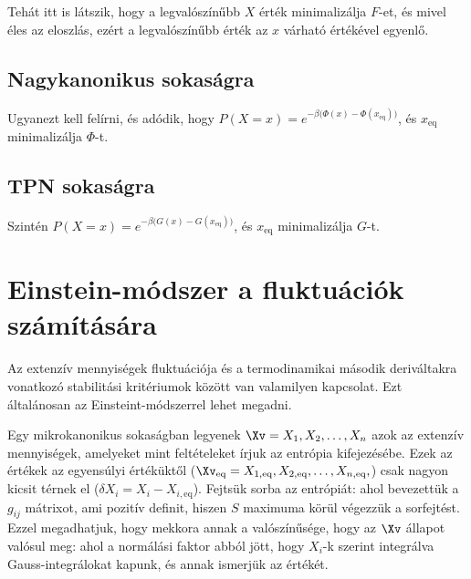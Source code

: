    Tehát itt is látszik, hogy a legvalószínűbb $X$ érték minimalizálja $F$-et, és mivel éles az eloszlás, ezért a legvalószínűbb érték az $x$ várható értékével egyenlő.
   
  \subsection{Nagykanonikus sokaságra}
   
   Ugyanezt kell felírni, és adódik, hogy $P(X=x)=e^{-\beta\big(\Phi(x)-\Phi(x_\text{eq})\big)}$, és $x_\text{eq}$ minimalizálja $\Phi$-t. 
   
  \subsection{TPN sokaságra}
  
   Szintén $P(X=x)=e^{-\beta\big(G(x)-G(x_\text{eq})\big)}$, és $x_\text{eq}$ minimalizálja $G$-t. 
  
 \section{Einstein-módszer a fluktuációk számítására} 
  
  Az extenzív mennyiségek fluktuációja és a termodinamikai második deriváltakra vonatkozó stabilitási kritériumok között van valamilyen kapcsolat.
   Ezt általánosan az Einsteint-módszerrel lehet megadni. 
  
  Egy mikrokanonikus sokaságban legyenek $\Xv=X_1,X_2,\dots,X_n$ azok az extenzív mennyiségek, amelyeket mint feltételeket írjuk az entrópia kifejezésébe.
   Ezek az értékek az egyensúlyi értéküktől ($\Xv_\text{eq}=X_{1,\text{eq}},X_{2,\text{eq}},\dots,X_{n,\text{eq}},$) csak nagyon kicsit térnek el ($\delta X_i=X_i-X_{i,\text{eq}}$).
   Fejtsük sorba az entrópiát:
  ahol bevezettük a $g_{ij}$ mátrixot, ami pozitív definit, hiszen $S$ maximuma körül végezzük a sorfejtést.
   Ezzel megadhatjuk, hogy mekkora annak a valószínűsége, hogy az $\Xv$ állapot valósul meg:
  ahol a normálási faktor abból jött, hogy $X_i$-k szerint integrálva Gauss-integrálokat kapunk, és annak ismerjük az értékét. 
  
